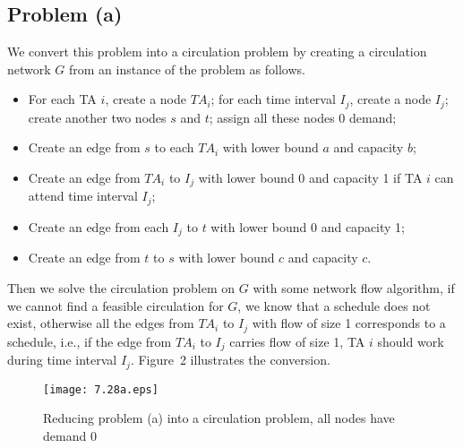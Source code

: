 \documentclass[12pt,letterpaper]{article}
\begin{document}
\subsection*{Problem (a)}
We convert this problem into a circulation problem by creating a circulation network $G$ from an instance of the problem as follows.
\begin{itemize}
\item For each TA $i$, create a node $TA_i$; for each time interval $I_j$, create a node $I_j$; create another two nodes $s$ and $t$; assign all these nodes 0 demand;
\item Create an edge from $s$ to each $TA_i$ with lower bound $a$ and capacity $b$;
\item Create an edge from $TA_i$ to $I_j$ with lower bound 0 and capacity 1 if TA $i$ can attend time interval $I_j$;
\item Create an edge from each $I_j$ to $t$ with lower bound 0 and capacity 1;
\item Create an edge from $t$ to $s$ with lower bound $c$ and capacity $c$.
\end{itemize}
Then we solve the circulation problem on $G$ with some network flow algorithm, if we cannot find a feasible circulation for $G$, we know that a schedule does not exist, otherwise all the edges from $TA_i$ to $I_j$ with flow of size 1 corresponds to a schedule, i.e., if the edge from $TA_i$ to $I_j$ carries flow of size 1, TA $i$ should work during time interval $I_j$. Figure~2 illustrates the conversion.
\begin{figure}
\begin{center}
\texttt{[image: 7.28a.eps]}
\caption{Reducing problem (a) into a circulation problem, all nodes have demand 0}
\end{center}
\end{figure}
\end{document}
